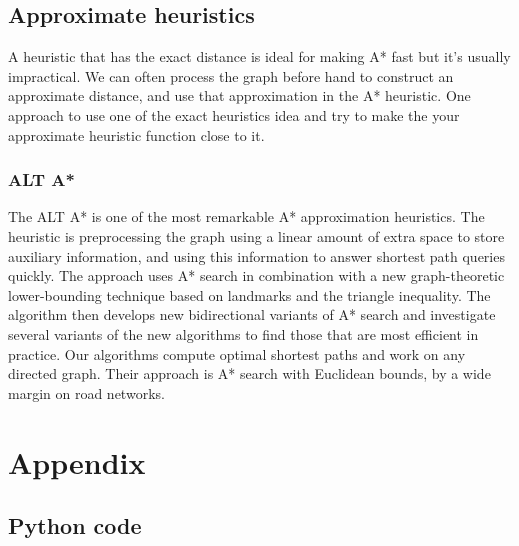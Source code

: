 \documentclass[12pt]{article}
\begin{document}
\newpage
\subsection{Approximate heuristics}
A heuristic that has the exact distance is ideal for making A* fast but it’s usually impractical. We can often process the graph before hand to construct an approximate distance, and use that approximation in the A* heuristic. One approach to use one of the exact heuristics idea and try to make the your approximate heuristic function close to it.

\subsubsection{ALT A* \cite{By Andrew Goldberg and Chris Harrelson}}
The ALT A* is one of the most remarkable A* approximation heuristics. The heuristic is preprocessing the graph using a linear amount of extra space to store auxiliary information, and using this information to answer shortest path queries quickly. The approach uses A* search in combination with a new graph-theoretic lower-bounding technique based on landmarks and the triangle inequality. The algorithm then develops new bidirectional variants of A* search and investigate several variants of the new algorithms to find those that are most efficient in practice. Our algorithms compute optimal shortest paths and work on any directed graph. Their approach is A* search with Euclidean bounds, by a wide margin on road networks.

\printbibliography

\section{Appendix}
\subsection{Python code}
\label{sec:pythonCode}

\end{document}
